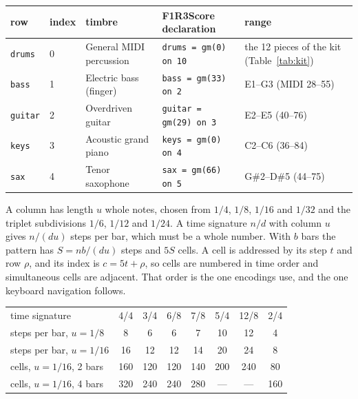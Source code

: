 \documentclass[11pt,a4paper]{article}
\newcommand{\code}[1]{\texttt{#1}}
\begin{document}
\begin{center}\small
\begin{tabularx}{\linewidth}{@{}l l l l X@{}}
\toprule
row & index & timbre & F1R3Score declaration & range\\
\midrule
\code{drums}  & 0 & General MIDI percussion       & \code{drums = gm(0) on 10}  & the 12 pieces of the kit (Table~\ref{tab:kit})\\
\code{bass}   & 1 & Electric bass (finger)        & \code{bass = gm(33) on 2}   & E1--G3 (MIDI 28--55)\\
\code{guitar} & 2 & Overdriven guitar             & \code{guitar = gm(29) on 3} & E2--E5 (40--76)\\
\code{keys}   & 3 & Acoustic grand piano          & \code{keys = gm(0) on 4}    & C2--C6 (36--84)\\
\code{sax}    & 4 & Tenor saxophone               & \code{sax = gm(66) on 5}    & G\#2--D\#5 (44--75)\\
\bottomrule
\end{tabularx}
\end{center}

A column has length $u$ whole notes, chosen from $1/4$, $1/8$, $1/16$ and $1/32$ and the triplet
subdivisions $1/6$, $1/12$ and $1/24$. A time signature $n/d$ with column $u$ gives $n/(du)$
steps per bar, which must be a whole number. With $b$ bars the pattern has $S=nb/(du)$ steps and
$5S$ cells. A cell is addressed by its step $t$ and row
$\rho$, and its index is $c=5t+\rho$, so cells are numbered in time order and simultaneous cells
are adjacent. That order is the one encodings use, and the one keyboard navigation follows.

\begin{center}\small
\begin{tabular}{@{}lccccccc@{}}
\toprule
time signature & 4/4 & 3/4 & 6/8 & 7/8 & 5/4 & 12/8 & 2/4\\
steps per bar, $u=1/8$   & 8 & 6 & 6 & 7 & 10 & 12 & 4\\
steps per bar, $u=1/16$  & 16 & 12 & 12 & 14 & 20 & 24 & 8\\
cells, $u=1/16$, 2 bars  & 160 & 120 & 120 & 140 & 200 & 240 & 80\\
cells, $u=1/16$, 4 bars  & 320 & 240 & 240 & 280 & --- & --- & 160\\
\bottomrule
\end{tabular}
\end{center}
\end{document}
